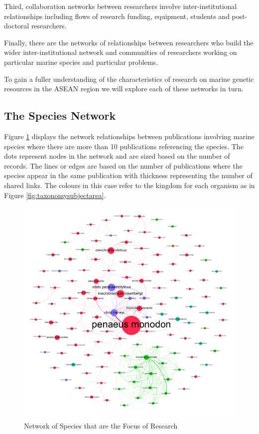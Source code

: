 \documentclass[openany]{book}
\theoremstyle{definition}
\theoremstyle{definition}
\theoremstyle{definition}
\theoremstyle{remark}
\begin{document}
Third, collaboration networks between researchers involve
inter-institutional relationships including flows of research funding,
equipment, students and post-doctoral researchers.

Finally, there are the networks of relationships between researchers who
build the wider inter-institutional network and communities of
researchers working on particular marine species and particular
problems.

To gain a fuller understanding of the characteristics of research on
marine genetic resources in the ASEAN region we will explore each of
these networks in turn.

\hypertarget{the-species-network}{%
\subsection{The Species Network}\label{the-species-network}}

Figure \ref{fig:speciesnetwork} displays the network relationships
between publications involving marine species where there are more than
10 publications referencing the species. The dots represent nodes in the
network and are sized based on the number of records. The lines or edges
are based on the number of publications where the species appear in the
same publication with thickness representing the number of shared links.
The colours in this case refer to the kingdom for each organism as in
Figure \ref{fig:taxonomysubjectarea}.

\begin{figure}

{\centering \includegraphics[width=1\linewidth]{images/aseanmarinlit_species_network_plus10} 

}

\caption{Network of Species that are the Focus of Research}\label{fig:speciesnetwork}
\end{figure}
\end{document}
